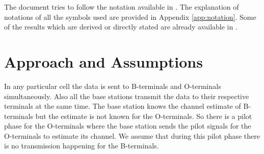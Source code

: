 \documentclass[10pt, a4paper, twoside,fleqn]{article}
\begin{document}
	The document tries to follow the notation available in \cite{bib:MassiveMimoBook}. The explanation of notations of all the symbols used are provided in Appendix \ref{app:notation}. Some of the results which are derived or directly stated are already available in \cite{bib:MassiveMimoBook}.

\section{Approach and Assumptions}	
	In any particular cell the data is sent to B-terminals and O-terminals simultaneously. Also all the base stations transmit the data to their respective terminals at the same time. The base station knows the channel estimate of B-terminals but the estimate is not known for the O-terminals. So there is a pilot phase for the O-terminals where the base station sends the pilot signals for the O-terminals to estimate its channel. We assume that during this pilot phase there is no transmission happening for the B-terminals. 
\end{document}
